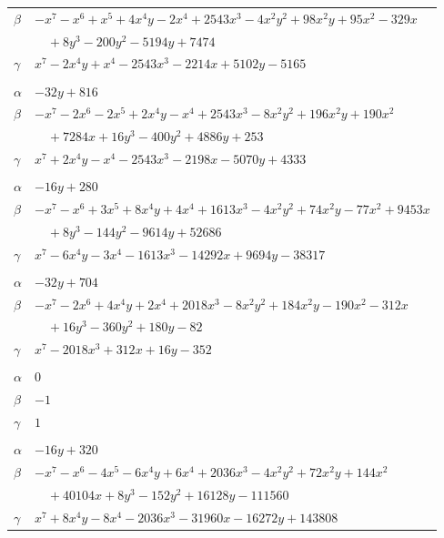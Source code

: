 \documentclass[11pt]{article}
\begin{document}
\begin{longtable}{@{}ll@{}}
$\beta$ & $-x^{7}-x^{6}+x^{5}+4x^{4}y-2x^{4}+2543x^{3}-4x^{2}y^{2}+98x^{2}y+95x^{2}-329x$\\
 & $\quad +8y^{3}-200y^{2}-5194y+7474$\\
$\gamma$ & $x^{7}-2x^{4}y+x^{4}-2543x^{3}-2214x+5102y-5165$\\
\addlinespace[3pt]
\multicolumn{2}{@{}l}{$\{i,j\}=\{84,106\}$, $k_{ij}=2^{5}\cdot 3^{2}\cdot 17$}\\
$\alpha$ & $-32y+816$\\
$\beta$ & $-x^{7}-2x^{6}-2x^{5}+2x^{4}y-x^{4}+2543x^{3}-8x^{2}y^{2}+196x^{2}y+190x^{2}$\\
 & $\quad +7284x+16y^{3}-400y^{2}+4886y+253$\\
$\gamma$ & $x^{7}+2x^{4}y-x^{4}-2543x^{3}-2198x-5070y+4333$\\
\addlinespace[3pt]
\multicolumn{2}{@{}l}{$\{i,j\}=\{85,103\}$, $k_{ij}=2^{6}\cdot 3^{4}\cdot 5^{2}$}\\
$\alpha$ & $-16y+280$\\
$\beta$ & $-x^{7}-x^{6}+3x^{5}+8x^{4}y+4x^{4}+1613x^{3}-4x^{2}y^{2}+74x^{2}y-77x^{2}+9453x$\\
 & $\quad +8y^{3}-144y^{2}-9614y+52686$\\
$\gamma$ & $x^{7}-6x^{4}y-3x^{4}-1613x^{3}-14292x+9694y-38317$\\
\addlinespace[3pt]
\multicolumn{2}{@{}l}{$\{i,j\}=\{85,106\}$, $k_{ij}=2\cdot 3^{3}\cdot 5$}\\
$\alpha$ & $-32y+704$\\
$\beta$ & $-x^{7}-2x^{6}+4x^{4}y+2x^{4}+2018x^{3}-8x^{2}y^{2}+184x^{2}y-190x^{2}-312x$\\
 & $\quad +16y^{3}-360y^{2}+180y-82$\\
$\gamma$ & $x^{7}-2018x^{3}+312x+16y-352$\\
\addlinespace[3pt]
\multicolumn{2}{@{}l}{$\{i,j\}=\{86,104\}$, $k_{ij}=2$}\\
$\alpha$ & $0$\\
$\beta$ & $-1$\\
$\gamma$ & $1$\\
\addlinespace[3pt]
\multicolumn{2}{@{}l}{$\{i,j\}=\{89,104\}$, $k_{ij}=2^{4}\cdot 3^{3}\cdot 7\cdot 13^{2}$}\\
$\alpha$ & $-16y+320$\\
$\beta$ & $-x^{7}-x^{6}-4x^{5}-6x^{4}y+6x^{4}+2036x^{3}-4x^{2}y^{2}+72x^{2}y+144x^{2}$\\
 & $\quad +40104x+8y^{3}-152y^{2}+16128y-111560$\\
$\gamma$ & $x^{7}+8x^{4}y-8x^{4}-2036x^{3}-31960x-16272y+143808$\\

\end{longtable}
\end{document}
